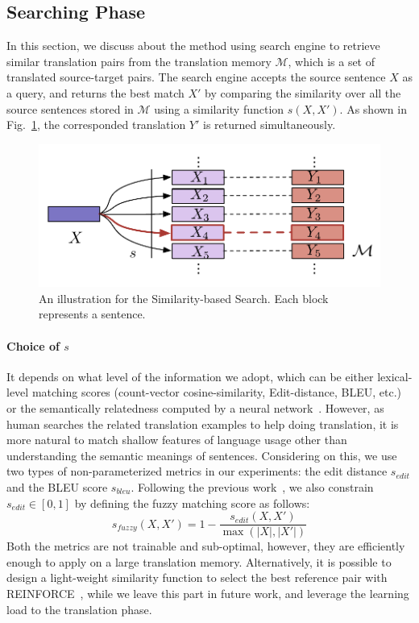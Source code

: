 \documentclass[11pt,letterpaper]{article}
\begin{document}
\subsection{Searching Phase}
In this section, we discuss about the method using search engine to retrieve similar translation pairs from the translation memory $\mathcal{M}$, which is a set of translated source-target pairs. The search engine accepts the source sentence $X$ as a query, and returns the best match $X'$ by comparing the similarity over all the source sentences stored in $\mathcal{M}$ using a similarity function $s(X, X')$. As shown in Fig.~\ref{fig.search}, the corresponded translation $Y'$ is returned simultaneously.
\begin{figure}[htbp]
\centering
\vspace{-8pt}
\includegraphics[width=0.85\linewidth]{figures/search.pdf}
\vspace{-5pt}
\caption{\label{fig.search}An illustration for the Similarity-based Search. Each block represents a sentence.}
\vspace{-8pt}
\end{figure}
\paragraph{Choice of $s$}
It depends on what level of the information we adopt, which can be either lexical-level matching scores (count-vector cosine-similarity, Edit-distance, BLEU, etc.) or the semantically relatedness computed by a neural network~\cite{hu2014convolutional}. However, as human searches the related translation examples to help doing translation, it is more natural to match shallow features of language usage other than understanding the semantic meanings of sentences. Considering on this, we use two types of non-parameterized metrics in our experiments: the edit distance $s_{edit}$ and the BLEU score $s_{bleu}$. Following the previous work~\cite{li2016phrase}, we also constrain $s_{edit}\in[0, 1]$ by defining the fuzzy matching score as follows:
\begin{equation}
s_{fuzzy}(X, X') = 1 - \frac{s_{edit}(X, X')}{\max\left(|X|, |X'|\right)}
\end{equation}
Both the metrics are not trainable and sub-optimal, however, they are efficiently enough to apply on a large translation memory. 
Alternatively, it is possible to design a light-weight similarity function to select the best reference pair with REINFORCE~\cite{williams1992simple}, while we leave this part in future work, and leverage the learning load to the translation phase.
\end{document}
